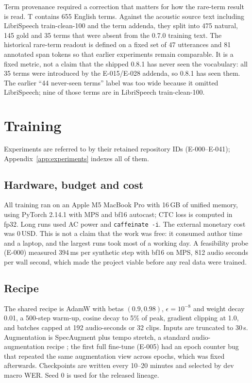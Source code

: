 \documentclass{article}
\begin{document}
Term provenance required a correction that matters for how the rare-term result is read. T
contains 655 English terms. Against the acoustic source text including LibriSpeech train-clean-100
and the term addenda, they split into 475 natural, 145 gold and 35 terms that were absent from the
0.7.0 training text. The historical rare-term readout is defined on a fixed set of 47
utterances and 81 annotated span tokens so that earlier experiments remain comparable. It is a
fixed metric, not a claim that the shipped 0.8.1 has never seen the vocabulary: all 35 terms were
introduced by the E-015/E-028 addenda, so 0.8.1 has seen them. The earlier ``44 never-seen
terms'' label was too wide because it omitted LibriSpeech; nine of those terms are in
LibriSpeech train-clean-100.

\section{Training}
\label{sec:training}

Experiments are referred to by their retained repository IDs (E-000--E-041); Appendix~\ref{app:experiments}
indexes all of them.

\subsection{Hardware, budget and cost}

All training ran on an Apple M5 MacBook Pro with 16\,GB of unified memory, using PyTorch 2.14.1
with MPS and bf16 autocast; CTC loss is computed in fp32. Long runs used AC power and
\texttt{caffeinate -i}. The external monetary cost was 0\,USD. This is not a claim that the work
was free: it consumed author time and a laptop, and the largest runs took most of a working day.
A feasibility probe (E-000) measured 394\,ms per synthetic step with bf16 on MPS, 812 audio
seconds per wall second, which made the project viable before any real data were trained.

\subsection{Recipe}

The shared recipe is AdamW with betas $(0.9,0.98)$, $\epsilon=10^{-8}$ and weight decay 0.01, a
500-step warm-up, cosine decay to 5\% of peak, gradient clipping at 1.0, and batches capped at
192 audio-seconds or 32 clips. Inputs are truncated to 30\,s. Augmentation is SpecAugment
\citep{park2019specaugment} plus tempo stretch, a standard audio-augmentation recipe
\citep{ko2015audio}; the first full fine-tune (E-005) had an epoch
counter bug that repeated the same augmentation view across epochs, which was fixed afterwards.
Checkpoints are written every 10--20 minutes and selected by dev macro WER. Seed 0 is used for the
released lineage.
\end{document}
